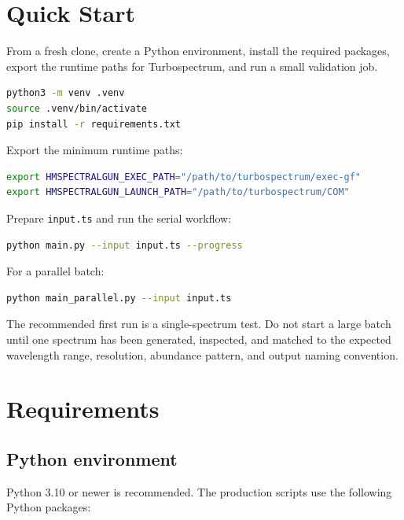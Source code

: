 \documentclass[11pt,a4paper]{article}
\newcommand{\code}[1]{\texttt{#1}}
\begin{document}
\section{Quick Start}

From a fresh clone, create a Python environment, install the required packages, export the runtime paths for Turbospectrum, and run a small validation job.

\begin{lstlisting}[language=bash]
python3 -m venv .venv
source .venv/bin/activate
pip install -r requirements.txt
\end{lstlisting}

Export the minimum runtime paths:

\begin{lstlisting}[language=bash]
export HMSPECTRALGUN_EXEC_PATH="/path/to/turbospectrum/exec-gf"
export HMSPECTRALGUN_LAUNCH_PATH="/path/to/turbospectrum/COM"
\end{lstlisting}

Prepare \code{input.ts} and run the serial workflow:

\begin{lstlisting}[language=bash]
python main.py --input input.ts --progress
\end{lstlisting}

For a parallel batch:

\begin{lstlisting}[language=bash]
python main_parallel.py --input input.ts
\end{lstlisting}

\begin{notebox}
The recommended first run is a single-spectrum test. Do not start a large batch until one spectrum has been generated, inspected, and matched to the expected wavelength range, resolution, abundance pattern, and output naming convention.
\end{notebox}

\section{Requirements}

\subsection{Python environment}

Python 3.10 or newer is recommended. The production scripts use the following Python packages:
\end{document}
